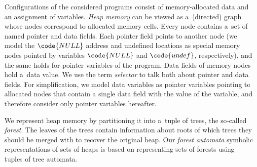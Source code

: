 Configurations of the considered programs consist of
memory-allocated data and an assignment of variables.
\emph{Heap memory} can be viewed as a~(directed) graph whose nodes correspond
to allocated memory cells.
Every node contains a~set of named pointer and data fields.
Each pointer field points to another node (we model the
$\code{NULL}$ address and undefined locations as special memory nodes pointed by variables
$\code{NULL}$ and $\code{undef}$, respectively), and the same holds for pointer variables of the program.
Data fields of memory nodes hold a~data value.
We use the term \emph{selector} to talk both about pointer and data fields.
For simplification, we model data variables as pointer variables pointing to
allocated nodes that contain a single data field with the value of the
variable, and therefore consider only pointer
variables hereafter.


We represent heap memory by partitioning it into a~tuple of trees, the
so-called \emph{forest}.
The leaves of the trees contain information about roots of which trees they should be merged with to recover the original heap. 
Our \emph{forest automata} symbolic representations of sets of heaps is based
on representing sets of forests using tuples of tree automata.
%


